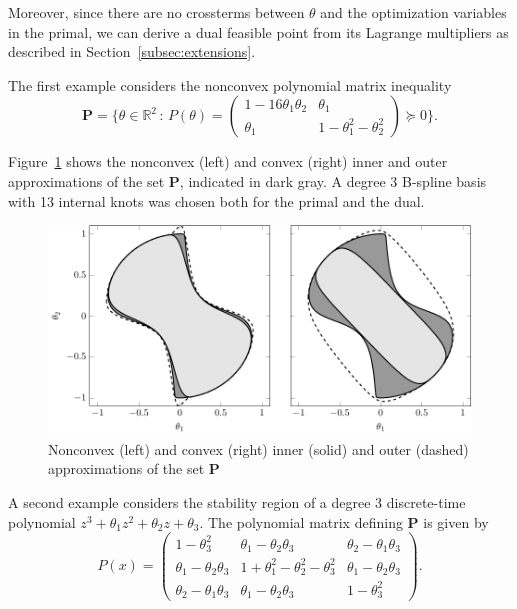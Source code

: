 \documentclass{article}
\newcommand{\R}{\mathbb{R}}         %
\newcommand{\ppar}{\theta}                          %
\begin{document}
Moreover, since there are no crossterms between $\ppar$ and the optimization
variables in the primal, we can derive a dual feasible point from its Lagrange
multipliers as described in Section~\ref{subsec:extensions}.

The first example considers the nonconvex polynomial matrix inequality
\[
\mathbf{P} = \{\ppar \in \R^2 \, : \, P(\ppar) = \begin{pmatrix} 1 - 16\ppar_1
\ppar_2 & \ppar_1 \\ \ppar_1 & 1 - \ppar_1^2 - \ppar_2^2 \end{pmatrix} \succeq
0 \}.
\]

Figure~\ref{fig:PMI1_Henrion2012} shows the nonconvex (left) and convex
(right) inner and outer approximations of the set $\mathbf{P}$, indicated in
dark gray. A degree 3 B-spline basis with 13 internal knots was chosen both
for the primal and the dual.

\begin{figure}
\centering
\includegraphics{figures/PMI1_Henrion2012_tikz.pdf}
\caption{Nonconvex (left) and convex (right) inner (solid) and outer (dashed)
approximations of the set $\mathbf{P}$}\label{fig:PMI1_Henrion2012}
\end{figure}

A second example considers the stability region of a degree 3 discrete-time
polynomial $z^3 + \ppar_1 z^2  + \ppar_2 z + \ppar_3$. The polynomial matrix
defining $\mathbf{P}$ is given by
\[
P(x) = \begin{pmatrix}
1 - \ppar_3^2 & \ppar_1 - \ppar_2 \ppar_3 & \ppar_2 - \ppar_1 \ppar_3 \\
\ppar_1 - \ppar_2 \ppar_3 & 1 + \ppar_1^2 - \ppar_2^2 - \ppar_3^2 & \ppar_1 -
\ppar_2 \ppar_3 \\
\ppar_2 - \ppar_1 \ppar_3 & \ppar_1 - \ppar_2 \ppar_3 & 1 - \ppar_3^2
\end{pmatrix}.
\]
\end{document}
